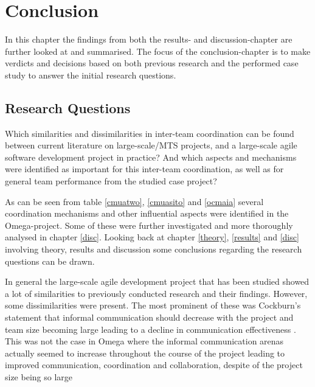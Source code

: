 \chapter{Conclusion}
\label{concl}

\minitoc

In this chapter the findings from both the results- and discussion-chapter are further looked at and summarised. The focus of the conclusion-chapter is to make verdicts and decisions based on both previous research and the performed case study to answer the initial research questions.

\newpage

\section{Research Questions}

\begin{fancyquotes}
Which similarities and dissimilarities in inter-team coordination can be found between current literature on large-scale/MTS projects, and a large-scale agile software development project in practice? And which aspects and mechanisms were identified as important for this inter-team coordination, as well as for general team performance from the studied case project?
\end{fancyquotes}

As can be seen from table \ref{cmuatwo}, \ref{cmuasito} and \ref{ocmaia} several coordination mechanisms and other influential aspects were identified in the Omega-project. Some of these were further investigated and more thoroughly analysed in chapter \ref{disc}. Looking back at chapter \ref{theory}, \ref{results} and \ref{disc} involving theory, results and discussion some conclusions regarding the research questions can be drawn.

In general the large-scale agile development project that has been studied showed a lot of similarities to previously conducted research and their findings. However, some dissimilarities were present. The most prominent of these was Cockburn's statement that informal communication should decrease with the project and team size becoming large leading to a decline in communication effectiveness \cite{Cockburn2000}. This was not the case in Omega where the informal communication arenas actually seemed to increase throughout the course of the project leading to improved communication, coordination and collaboration, despite of the project size being so large

